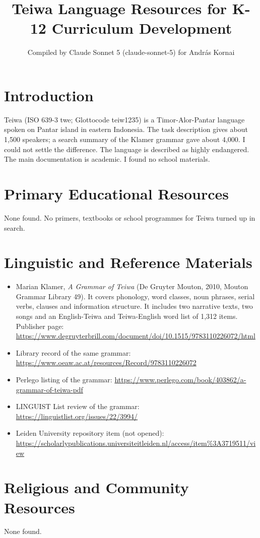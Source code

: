 \documentclass[12pt]{article}
\title{Teiwa Language Resources for K-12 Curriculum Development}
\author{Compiled by Claude Sonnet 5 (claude-sonnet-5) for Andr\'as Kornai}
\date{}
\begin{document}
\maketitle

\section{Introduction}
Teiwa (ISO 639-3 twe; Glottocode teiw1235) is a Timor-Alor-Pantar language spoken on Pantar island in eastern Indonesia. The task description gives about 1,500 speakers; a search summary of the Klamer grammar gave about 4,000. I could not settle the difference. The language is described as highly endangered. The main documentation is academic. I found no school materials.

\section{Primary Educational Resources}
None found. No primers, textbooks or school programmes for Teiwa turned up in search.

\section{Linguistic and Reference Materials}
\begin{itemize}
\item Marian Klamer, \emph{A Grammar of Teiwa} (De Gruyter Mouton, 2010, Mouton Grammar Library 49). It covers phonology, word classes, noun phrases, serial verbs, clauses and information structure. It includes two narrative texts, two songs and an English-Teiwa and Teiwa-English word list of 1,312 items. Publisher page: \url{https://www.degruyterbrill.com/document/doi/10.1515/9783110226072/html}
\item Library record of the same grammar: \url{https://www.oeaw.ac.at/resources/Record/9783110226072}
\item Perlego listing of the grammar: \url{https://www.perlego.com/book/403862/a-grammar-of-teiwa-pdf}
\item LINGUIST List review of the grammar: \url{https://linguistlist.org/issues/22/3994/}
\item Leiden University repository item (not opened): \url{https://scholarlypublications.universiteitleiden.nl/access/item%3A3719511/view}
\end{itemize}

\section{Religious and Community Resources}
None found.
\end{document}
